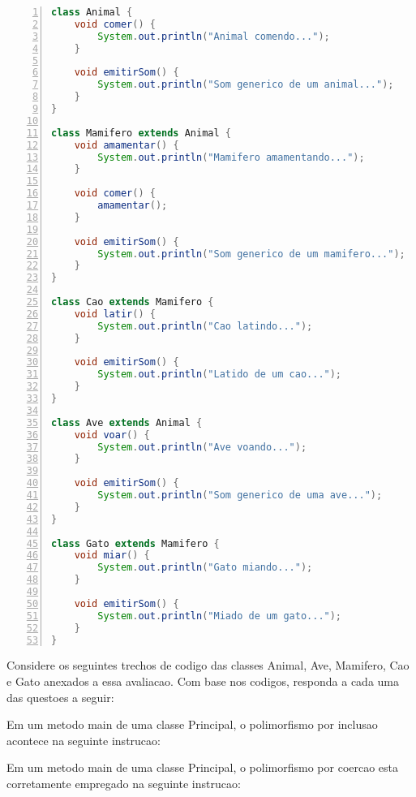 \begin{lstlisting}[language=java, basicstyle=\ttfamily\small, numbers=left, numbersep=5pt, showstringspaces=false]
class Animal {
    void comer() {
        System.out.println("Animal comendo...");
    }

    void emitirSom() {
        System.out.println("Som generico de um animal...");
    }
}

class Mamifero extends Animal {
    void amamentar() {
        System.out.println("Mamifero amamentando...");
    } 

    void comer() {
        amamentar();
    }

    void emitirSom() {
        System.out.println("Som generico de um mamifero...");
    }
}

class Cao extends Mamifero {
    void latir() {
        System.out.println("Cao latindo...");
    }

    void emitirSom() {
        System.out.println("Latido de um cao...");
    }
}

class Ave extends Animal {
    void voar() {
        System.out.println("Ave voando...");
    }

    void emitirSom() {
        System.out.println("Som generico de uma ave...");
    }
}

class Gato extends Mamifero {
    void miar() {
        System.out.println("Gato miando...");
    }

    void emitirSom() {
        System.out.println("Miado de um gato...");
    }
}
\end{lstlisting}

\begin{multiplechoice}[rearrange=yes]
  Considere os seguintes trechos de codigo das classes Animal, Ave, Mamifero, Cao e Gato anexados a essa avaliacao. Com base nos codigos, responda a cada uma das questoes a seguir:

  \begin{question}
     Em um metodo main de uma classe Principal, o polimorfismo por inclusao acontece na seguinte instrucao: 
  \end{question}

  \begin{question} 
     Em um metodo main de uma classe Principal, o polimorfismo por coercao esta corretamente empregado na seguinte instrucao: 
  \end{question}
\end{multiplechoice}

